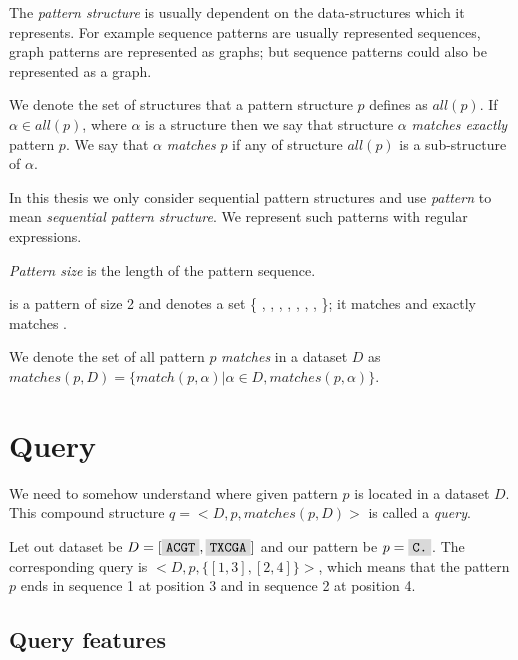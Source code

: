 The \emph{pattern structure} is usually dependent on the data-structures which it represents. For example sequence patterns are usually represented sequences, graph patterns are represented as graphs; but sequence patterns could also be represented as a graph.

We denote the set of structures that a pattern structure $p$ defines as $all(p)$. If $\alpha \in all(p)$, where $\alpha$ is a structure then we say that
structure $\alpha$ \emph{matches exactly} pattern $p$. We say that $\alpha$ \emph{matches} $p$ if any of structure $all(p)$ is a sub-structure of $\alpha$.

In this thesis we only consider sequential pattern structures and use \emph{pattern} to mean \emph{sequential pattern structure}. We represent such patterns with regular expressions. 


\emph{Pattern size} is the length of the pattern sequence.

\begin{exmp}
 is a pattern of size 2 and denotes a set 
\{ , , , , , , , \}; it matches  and exactly matches .	
\end{exmp}

We denote the set of all pattern $p$ \emph{matches} in a dataset $D$ as $matches(p, D) = \{ match(p, \alpha) | \alpha \in D, matches(p, \alpha) \}$.

\section{Query}

We need to somehow understand where given pattern $p$ is located in a dataset $D$. This compound structure $q = <D, p, matches(p, D)>$ is called a \emph{query}.

\begin{exmp}
Let out dataset be $D = [ \text{\R{ACGT}}, \text{\R{TXCGA}} ]$ and our pattern be $p = \text{\R{C.}}$. The corresponding query is $<D, p, \{ [1,3], [2,4]\}>$, which means that the pattern $p$ ends in sequence 1 at position 3 and in sequence 2 at position 4.
\end{exmp}

\subsection{Query features}

